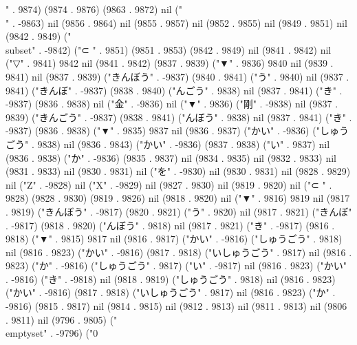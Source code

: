 " . 9874) (9874 . 9876) (9863 . 9872) nil ("\\" . -9863) nil (9856 . 9864) nil (9855 . 9857) nil (9852 . 9855) nil (9849 . 9851) nil (9842 . 9849) ("\\subset" . -9842) ("⊂
" . 9851) (9851 . 9853) (9842 . 9849) nil (9841 . 9842) nil ("▽" . 9841) 9842 nil (9841 . 9842) (9837 . 9839) ("▼" . 9836) 9840 nil (9839 . 9841) nil (9837 . 9839) ("きんぼう" . -9837) (9840 . 9841) ("う" . 9840) nil (9837 . 9841) ("きんぼ" . -9837) (9838 . 9840) ("んごう" . 9838) nil (9837 . 9841) ("き" . -9837) (9836 . 9838) nil ("金" . -9836) nil ("▼" . 9836) ("剛" . -9838) nil (9837 . 9839) ("きんごう" . -9837) (9838 . 9841) ("んぼう" . 9838) nil (9837 . 9841) ("き" . -9837) (9836 . 9838) ("▼" . 9835) 9837 nil (9836 . 9837) ("かい" . -9836) ("しゅうごう" . 9838) nil (9836 . 9843) ("かい" . -9836) (9837 . 9838) ("い" . 9837) nil (9836 . 9838) ("か" . -9836) (9835 . 9837) nil (9834 . 9835) nil (9832 . 9833) nil (9831 . 9833) nil (9830 . 9831) nil ("を" . -9830) nil (9830 . 9831) nil (9828 . 9829) nil ("Z" . -9828) nil ("X" . -9829) nil (9827 . 9830) nil (9819 . 9820) nil ("⊂
" . 9828) (9828 . 9830) (9819 . 9826) nil (9818 . 9820) nil ("▼" . 9816) 9819 nil (9817 . 9819) ("きんぼう" . -9817) (9820 . 9821) ("う" . 9820) nil (9817 . 9821) ("きんぼ" . -9817) (9818 . 9820) ("んぼう" . 9818) nil (9817 . 9821) ("き" . -9817) (9816 . 9818) ("▼" . 9815) 9817 nil (9816 . 9817) ("かい" . -9816) ("しゅうごう" . 9818) nil (9816 . 9823) ("かい" . -9816) (9817 . 9818) ("いしゅうごう" . 9817) nil (9816 . 9823) ("か" . -9816) ("しゅうごう" . 9817) ("い" . -9817) nil (9816 . 9823) ("かい" . -9816) ("き" . -9818) nil (9818 . 9819) ("しゅうごう" . 9818) nil (9816 . 9823) ("かい" . -9816) (9817 . 9818) ("いしゅうごう" . 9817) nil (9816 . 9823) ("か" . -9816) (9815 . 9817) nil (9814 . 9815) nil (9812 . 9813) nil (9811 . 9813) nil (9806 . 9811) nil (9796 . 9805) ("\\emptyset" . -9796) ("0

